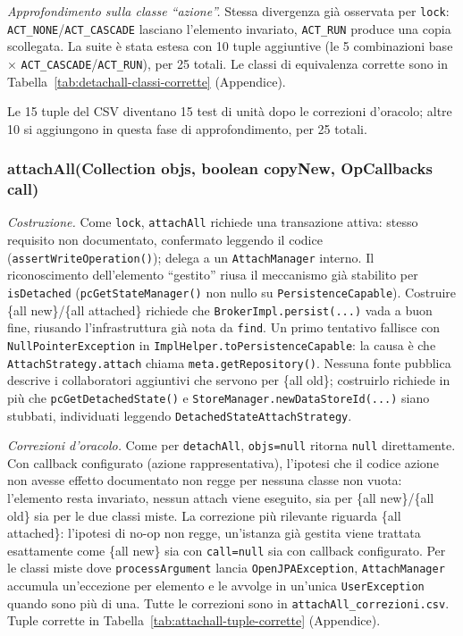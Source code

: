 \textit{Approfondimento sulla classe ``azione''.} Stessa divergenza già osservata per
\texttt{lock}: \texttt{ACT\_NONE}/\texttt{ACT\_CASCADE} lasciano l'elemento invariato,
\texttt{ACT\_RUN} produce una copia scollegata. La suite è stata estesa con 10 tuple aggiuntive
(le 5 combinazioni base $\times$ \texttt{ACT\_CASCADE}/\texttt{ACT\_RUN}), per 25 totali. Le
classi di equivalenza corrette sono in Tabella~\ref{tab:detachall-classi-corrette} (Appendice).

Le 15 tuple del CSV diventano 15 test di unità dopo le correzioni d'oracolo; altre 10 si
aggiungono in questa fase di approfondimento, per 25 totali.

\subsubsection{attachAll(Collection objs, boolean copyNew, OpCallbacks call)}

\textit{Costruzione.} Come \texttt{lock}, \texttt{attachAll} richiede una transazione attiva:
stesso requisito non documentato, confermato leggendo il codice (\texttt{assertWriteOperation()});
delega a un \texttt{AttachManager} interno. Il
riconoscimento dell'elemento ``gestito'' riusa il meccanismo già stabilito per \texttt{isDetached}
(\texttt{pcGetStateManager()} non nullo su \texttt{PersistenceCapable}). Costruire \{all
new\}/\{all attached\} richiede che \texttt{BrokerImpl.persist(...)} vada a buon fine, riusando
l'infrastruttura già nota da \texttt{find}. Un primo tentativo fallisce con
\texttt{NullPointerException} in \texttt{ImplHelper.toPersistenceCapable}: la causa è che \texttt{AttachStrategy.attach} chiama \texttt{meta.getRepository()}. Nessuna fonte pubblica descrive i collaboratori aggiuntivi che
servono per \{all old\}; costruirlo richiede in più che \texttt{pcGetDetachedState()} e
\texttt{StoreManager.newDataStoreId(...)} siano stubbati, individuati leggendo
\texttt{DetachedStateAttachStrategy}.

\textit{Correzioni d'oracolo.} Come per \texttt{detachAll}, \texttt{objs=null} ritorna
\texttt{null} direttamente. Con callback configurato (azione rappresentativa), l'ipotesi che il
codice azione non avesse effetto documentato non regge per nessuna classe non vuota: l'elemento
resta invariato, nessun attach viene eseguito, sia per \{all new\}/\{all old\} sia per le due
classi miste. La correzione più rilevante riguarda \{all attached\}: l'ipotesi di
no-op non regge, un'istanza già gestita viene trattata esattamente come \{all new\} sia con
\texttt{call=null} sia con callback configurato. Per le
classi miste dove \texttt{processArgument} lancia
\texttt{OpenJPAException}, \texttt{AttachManager} accumula un'eccezione per elemento e le avvolge in un'unica
\texttt{UserException} quando sono più di una. Tutte le correzioni sono in
\texttt{attachAll\_correzioni.csv}. Tuple corrette in Tabella~\ref{tab:attachall-tuple-corrette}
(Appendice).

